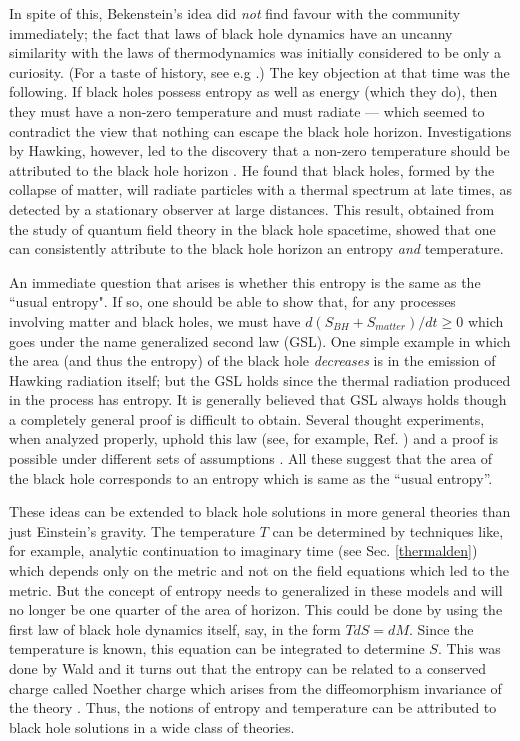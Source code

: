 \documentclass[12pt]{iopart}
\begin{document}
In spite of this, 
Bekenstein's idea did \textit{not} find favour with the community  immediately; the fact that laws of black hole dynamics have an uncanny similarity with the laws of 
thermodynamics  
was initially considered to be only a curiosity. 
(For a taste of history, see e.g \cite{kst}.)
The key objection at that time  was the following. If black holes possess entropy as well as energy (which they do), then they must have a non-zero temperature and must radiate --- which seemed to contradict the view that nothing can escape the black hole horizon. Investigations  by Hawking, however, led  to the discovery that a non-zero temperature should be attributed to the 
black hole horizon \cite{Hawking:1975sw}. 
He found that black holes, formed by the collapse of matter, will radiate particles with a thermal spectrum at late times, as detected by a stationary observer at large distances.
This result, obtained from the study of quantum field theory in the black hole spacetime, showed that one can consistently attribute to the black hole horizon an entropy \textit{and} temperature. 


 An immediate question that arises is whether this entropy  is the same as the ``usual
   entropy". If so, one should be able to show that, for any processes involving matter and black holes,
   we must have $d(S_{BH}+S_{matter})/dt\geq 0$ which goes under the name generalized 
   second law (GSL).  One simple example in which the area (and thus the entropy) of the black hole 
   \emph{decreases} is in the emission of Hawking radiation itself; but the GSL holds since the thermal radiation produced in the process has entropy.
   It is generally believed that GSL always holds though a completely general proof
   is difficult to obtain. Several thought experiments, when analyzed properly, uphold this law (see, for example, Ref. \cite{Unruh:1982ic})
   and a proof is possible under different sets of assumptions  \cite{tenproofs}.  
   All these suggest that the area of the black hole 
   corresponds to an entropy which is  same  as the ``usual entropy''. 

These ideas  can be extended to black hole solutions in more general  theories   than just Einstein's gravity. 
The temperature $T$  can be determined 
by    techniques like, for example,  analytic continuation to imaginary time (see Sec. \ref{thermalden}) which depends only on the metric and not on the field equations which led to the metric. But the concept of entropy needs to  generalized in these models and will no longer  be one quarter of the area of horizon. 
This could be done by using the  first law of black hole dynamics
itself, say, in the form $TdS = dM$. Since the temperature is known, this equation can be integrated to determine $S$. This was done by Wald and it turns out that the entropy can be related to a conserved charge called Noether charge which arises from the diffeomorphism invariance of the theory \cite{Wald:1993nt}.
Thus,  the notions of entropy and temperature  can be attributed to  black hole solutions in a wide class of theories.
\end{document}
